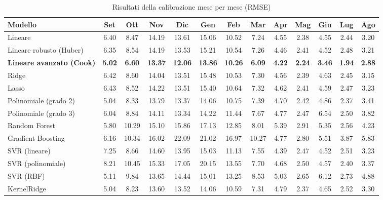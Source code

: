 \begin{table}[H]
    \tiny
    \centering
    \setlength{\tabcolsep}{4pt}
    \def\arraystretch{1.5}
    \begin{tabular}{|l|c|c|c|c|c|c|c|c|c|c|c|c|}
    \hline
        \textbf{Modello} & \textbf{Set} & \textbf{Ott} & \textbf{Nov} & \textbf{Dic} & \textbf{Gen} & \textbf{Feb} & \textbf{Mar} & \textbf{Apr} & \textbf{Mag} & \textbf{Giu} & \textbf{Lug} & \textbf{Ago} \\ \hline
        Lineare & 6.40 & 8.47 & 14.19 & 13.61 & 15.06 & 10.52 & 7.24 & 4.55 & 2.38 & 4.55 & 2.44 & 3.20 \\ \hline
        Lineare robusto (Huber) & 6.35 & 8.54 & 14.19 & 13.53 & 15.21 & 10.54 & 7.26 & 4.46 & 2.41 & 4.52 & 2.48 & 3.21 \\ \hline
        \textbf{Lineare avanzato (Cook)} & \textbf{5.02} & \textbf{6.60} & \textbf{13.37} & \textbf{12.06} & \textbf{13.86} & \textbf{10.26} & \textbf{6.09} & \textbf{4.22} & \textbf{2.24} & \textbf{3.46} & \textbf{1.94} & \textbf{2.88} \\ \hline
        Ridge & 6.42 & 8.60 & 14.04 & 13.51 & 15.48 & 10.53 & 7.30 & 4.56 & 2.39 & 4.63 & 2.45 & 3.15 \\ \hline
        Lasso & 6.43 & 8.52 & 14.22 & 13.51 & 15.40 & 10.64 & 7.32 & 4.62 & 2.41 & 4.59 & 2.47 & 3.23 \\ \hline
        Polinomiale (grado 2) & 5.04 & 8.33 & 13.79 & 13.37 & 14.06 & 10.75 & 7.39 & 4.70 & 2.42 & 4.86 & 2.37 & 3.41 \\ \hline
        Polinomiale (grado 3) & 6.04 & 8.84 & 14.11 & 13.34 & 14.22 & 11.44 & 7.67 & 4.77 & 2.47 & 6.54 & 2.50 & 3.82 \\ \hline
        Random Forest & 5.80 & 10.29 & 15.10 & 15.86 & 17.13 & 12.85 & 8.01 & 5.39 & 2.91 & 5.35 & 2.56 & 4.23 \\ \hline
        Gradient Boosting & 6.16 & 10.34 & 16.02 & 22.09 & 21.02 & 16.97 & 10.27 & 4.77 & 2.80 & 5.51 & 3.87 & 5.83 \\ \hline
        SVR (lineare) & 7.25 & 8.66 & 14.60 & 13.95 & 15.03 & 11.13 & 7.55 & 4.39 & 2.47 & 4.52 & 2.51 & 3.23 \\ \hline
        SVR (polinomiale) & 8.21 & 10.45 & 15.33 & 17.05 & 20.15 & 13.55 & 7.70 & 4.68 & 2.50 & 4.57 & 2.40 & 3.37 \\ \hline
        SVR (RBF) & 5.11 & 9.84 & 13.65 & 14.44 & 15.01 & 13.25 & 8.53 & 5.03 & 2.65 & 6.12 & 2.73 & 4.88 \\ \hline
        KernelRidge & 5.04 & 8.23 & 13.60 & 13.52 & 14.06 & 10.59 & 7.31 & 4.79 & 2.37 & 4.65 & 2.52 & 3.30 \\ \hline
    \end{tabular}
    \caption{Risultati della calibrazione  mese per mese (RMSE)}
    \label{fig:risultati-pm10-rmse-mese}
\end{table}

